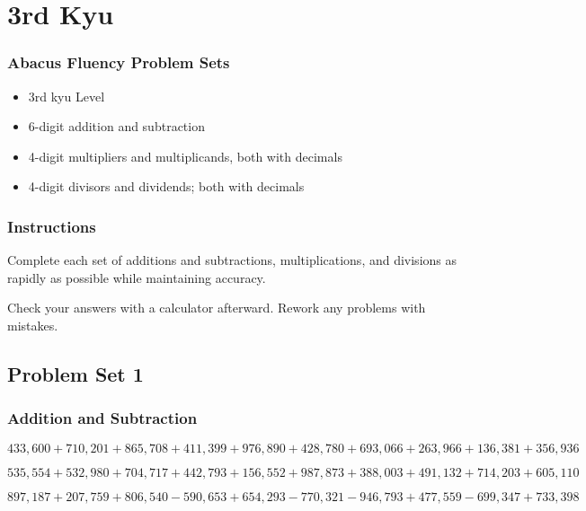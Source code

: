 \hypertarget{rd-kyu}{%
\section{3rd Kyu}\label{rd-kyu}}

\hypertarget{abacus-fluency-problem-sets-5}{%
\subsubsection{Abacus Fluency Problem
Sets}\label{abacus-fluency-problem-sets-5}}

\begin{itemize}
\item
  3rd kyu Level
\item
  6-digit addition and subtraction
\item
  4-digit multipliers and multiplicands, both with decimals
\item
  4-digit divisors and dividends; both with decimals
\end{itemize}

\hypertarget{instructions-5}{%
\subsubsection{Instructions}\label{instructions-5}}

Complete each set of additions and subtractions, multiplications, and
divisions as rapidly as possible while maintaining accuracy.

Check your answers with a calculator afterward. Rework any problems with
mistakes.

\hypertarget{problem-set-1-4}{%
\subsection{Problem Set 1}\label{problem-set-1-4}}

\hypertarget{addition-and-subtraction-306}{%
\subsubsection{Addition and
Subtraction}\label{addition-and-subtraction-306}}

\(433,600+710,201+865,708+411,399+976,890+428,780+693,066+263,966+136,381+ 356,936\)

\(535,554+532,980+704,717+442,793+156,552+987,873+388,003+491,132+714,203+605,110\)

\(897,187+207,759+806,540-590,653+654,293-770,321-946,793+477,559-699,347+733,398\)

